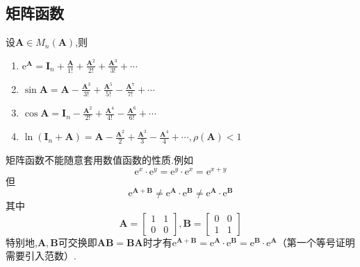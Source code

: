 \subsection{矩阵函数}
\begin{formal}
    \begin{definition}[简单矩阵函数的定义]\label{def:简单矩阵函数的定义}
        设$\bm{A}\in M_n\left(\bm{A}\right)$,则\begin{enumerate}[label={\textup{(\arabic*)}}]
            \item $\displaystyle \mathrm{e}^{\bm{A}}=\bm{I}_n+\frac{\bm{A}}{1!}+\frac{\bm{A}^2}{2!}+\frac{\bm{A}^3}{3!}+\cdots$
            \item $\displaystyle
            \sin \bm{A}= \bm{A}-\frac{\bm{A}^3}{3!}+\frac{\bm{A}^5}{5!}-\frac{\bm{A}^7}{7!}+\cdots
            $
            \item $\displaystyle
            \cos \bm{A}=\bm{I}_n-\frac{\bm{A}^2}{2!}+\frac{\bm{A}^4}{4!}-\frac{\bm{A}^6}{6!}+\cdots
            $
            \item $\displaystyle
            \ln\left(
                \bm{I}_n+\bm{A}
            \right)=\bm{A}-\frac{\bm{A}^2}{2}+\frac{\bm{A}^3}{3}-\frac{\bm{A}^4}{4}+\cdots,\rho\left(\bm{A}\right)<1
            $
        \end{enumerate}
    \end{definition}
\end{formal}
\begin{red}
\begin{remark}
    矩阵函数不能随意套用数值函数的性质.例如\[
    \mathrm{e}^x\cdot \mathrm{e}^y=
    \mathrm{e}^y\cdot \mathrm{e}^x
    =\mathrm{e}^{x+y}
    \]但\[
    \mathrm{e}^{\bm{A}+\bm{B}}
    \neq
    \mathrm{e}^{\bm{A}}\cdot \mathrm{e}^{\bm{B}}\neq \mathrm{e}^{\bm{A}}\cdot \mathrm{e}^{\bm{B}}
    \]其中\[
    \bm{A}=\begin{bmatrix}
        1&1\\0&0
    \end{bmatrix},\bm{B}=\begin{bmatrix}
        0&0\\1&1
    \end{bmatrix}
    \]特别地,$\bm{A},\bm{B}$可交换即$\bm{AB}=\bm{BA}$时才有$\mathrm{e}^{\bm{A}+\bm{B}}=\mathrm{e}^{\bm{A}}\cdot \mathrm{e}^{\bm{B} }=\mathrm{e}^{\bm{B}}\cdot \mathrm{e}^{\bm{A}}$（第一个等号证明需要引入范数）.
\end{remark}
\end{red}
